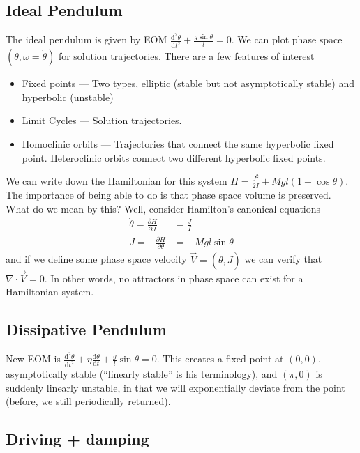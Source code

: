 \documentclass[10pt]{article}
\newcommand{\rd}[2]{\frac{\mathrm{d}#1}{\mathrm{d}#2}}
\newcommand{\pd}[2]{\frac{\partial#1}{\partial#2}}
\newcommand{\rtd}[2]{\frac{\mathrm{d}^2#1}{\mathrm{d}#2^2}}
\begin{document}
\subsection{Ideal Pendulum}

The ideal pendulum is given by EOM $\rtd{\theta}{t} + \frac{g\sin\theta}{l} = 0$. We can plot phase space $(\theta, \omega = \dot{\theta})$ for solution trajectories. There are a few features of interest
\begin{itemize}
    \item Fixed points --- Two types, elliptic (stable but not asymptotically stable) and hyperbolic (unstable)
    \item Limit Cycles --- Solution trajectories.
    \item Homoclinic orbits --- Trajectories that connect the same hyperbolic fixed point. Heteroclinic orbits connect two different hyperbolic fixed points.
\end{itemize}

We can write down the Hamiltonian for this system $H = \frac{J^2}{2I} + Mgl(1-\cos\theta)$. The importance of being able to do is that phase space volume is preserved. What do we mean by this? Well, consider Hamilton's canonical equations
\begin{align}
    \dot{\theta} = \pd{H}{J} &= \frac{J}{I} \nonumber\\
    \dot{J} = -\pd{H}{\theta} &= -Mgl\sin\theta
\end{align}
and if we define some phase space velocity $\vec{V} = \left( \dot{\theta}, \dot{J} \right)$ we can verify that $\nabla \cdot \vec{V} = 0$. In other words, no attractors in phase space can exist for a Hamiltonian system.

\subsection{Dissipative Pendulum}

New EOM is $\rtd{\theta}{t} + \eta \rd{\theta}{t} + \frac{g}{l}\sin\theta = 0$. This creates a fixed point at $(0,0)$, asymptotically stable (``linearly stable'' is his terminology), and $(\pi,0)$ is suddenly linearly unstable, in that we will exponentially deviate from the point (before, we still periodically returned).

\subsection{Driving + damping}
\end{document}

